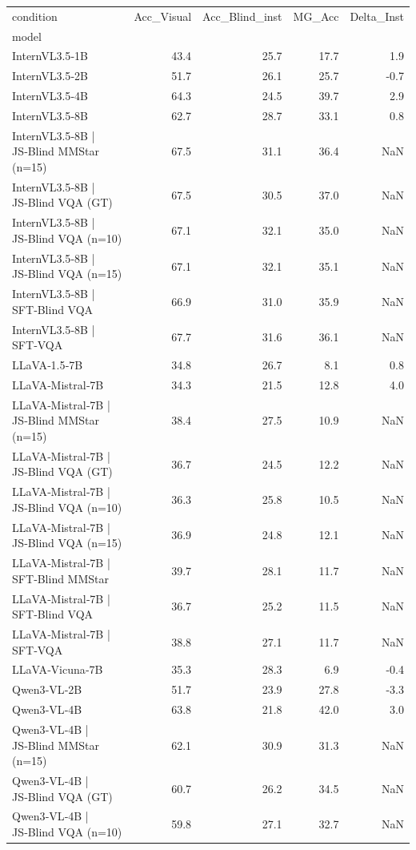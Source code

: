 \begin{tabular}{lrrrr}
\toprule
condition & Acc_Visual & Acc_Blind_inst & MG_Acc & Delta_Inst \\
model &  &  &  &  \\
\midrule
InternVL3.5‑1B & 43.4 & 25.7 & 17.7 & 1.9 \\
InternVL3.5‑2B & 51.7 & 26.1 & 25.7 & -0.7 \\
InternVL3.5‑4B & 64.3 & 24.5 & 39.7 & 2.9 \\
InternVL3.5‑8B & 62.7 & 28.7 & 33.1 & 0.8 \\
InternVL3.5‑8B | JS‑Blind MMStar (n=15) & 67.5 & 31.1 & 36.4 & NaN \\
InternVL3.5‑8B | JS‑Blind VQA (GT) & 67.5 & 30.5 & 37.0 & NaN \\
InternVL3.5‑8B | JS‑Blind VQA (n=10) & 67.1 & 32.1 & 35.0 & NaN \\
InternVL3.5‑8B | JS‑Blind VQA (n=15) & 67.1 & 32.1 & 35.1 & NaN \\
InternVL3.5‑8B | SFT‑Blind VQA & 66.9 & 31.0 & 35.9 & NaN \\
InternVL3.5‑8B | SFT‑VQA & 67.7 & 31.6 & 36.1 & NaN \\
LLaVA‑1.5‑7B & 34.8 & 26.7 & 8.1 & 0.8 \\
LLaVA‑Mistral‑7B & 34.3 & 21.5 & 12.8 & 4.0 \\
LLaVA‑Mistral‑7B | JS‑Blind MMStar (n=15) & 38.4 & 27.5 & 10.9 & NaN \\
LLaVA‑Mistral‑7B | JS‑Blind VQA (GT) & 36.7 & 24.5 & 12.2 & NaN \\
LLaVA‑Mistral‑7B | JS‑Blind VQA (n=10) & 36.3 & 25.8 & 10.5 & NaN \\
LLaVA‑Mistral‑7B | JS‑Blind VQA (n=15) & 36.9 & 24.8 & 12.1 & NaN \\
LLaVA‑Mistral‑7B | SFT‑Blind MMStar & 39.7 & 28.1 & 11.7 & NaN \\
LLaVA‑Mistral‑7B | SFT‑Blind VQA & 36.7 & 25.2 & 11.5 & NaN \\
LLaVA‑Mistral‑7B | SFT‑VQA & 38.8 & 27.1 & 11.7 & NaN \\
LLaVA‑Vicuna‑7B & 35.3 & 28.3 & 6.9 & -0.4 \\
Qwen3‑VL‑2B & 51.7 & 23.9 & 27.8 & -3.3 \\
Qwen3‑VL‑4B & 63.8 & 21.8 & 42.0 & 3.0 \\
Qwen3‑VL‑4B | JS‑Blind MMStar (n=15) & 62.1 & 30.9 & 31.3 & NaN \\
Qwen3‑VL‑4B | JS‑Blind VQA (GT) & 60.7 & 26.2 & 34.5 & NaN \\
Qwen3‑VL‑4B | JS‑Blind VQA (n=10) & 59.8 & 27.1 & 32.7 & NaN \\

\end{tabular}
